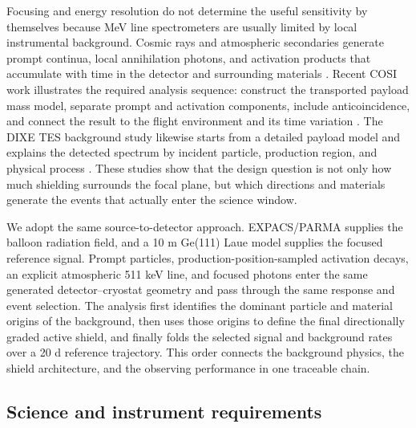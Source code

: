 \documentclass[11pt]{article}
\begin{document}
Focusing and energy resolution do not determine the useful sensitivity by
themselves because MeV line spectrometers are usually limited by local
instrumental background. Cosmic rays and atmospheric secondaries generate
prompt continua, local annihilation photons, and activation products that
accumulate with time in the detector and surrounding materials
\cite{Sturner2003,Gehrels1985}. Recent COSI work illustrates the required
analysis sequence: construct the transported payload mass model, separate
prompt and activation components, include anticoincidence, and connect the
result to the flight environment and its time variation
\cite{Kierans2017,Gallego2025Balloon,Gallego2025,Beechert2022,Sleator2019,Ciabattoni2025ACS}. The DIXE
TES background study likewise starts from a detailed payload model and explains
the detected spectrum by incident particle, production region, and physical
process \cite{Tian2026DIXE}. These studies show that the design question is not
only how much shielding surrounds the focal plane, but which directions and
materials generate the events that actually enter the science window.

We adopt the same source-to-detector approach. EXPACS/PARMA supplies the
balloon radiation field, and a 10 m Ge(111) Laue model supplies the focused
reference signal. Prompt particles, production-position-sampled activation
decays, an explicit atmospheric 511 keV line, and focused photons enter the
same generated detector--cryostat geometry and pass through the same response
and event selection. The analysis first identifies the dominant particle and
material origins of the background, then uses those origins to define the
final directionally graded active shield, and finally folds the selected signal
and background rates over a 20 d reference trajectory. This order connects the
background physics, the shield architecture, and the observing performance in
one traceable chain.

\subsection{Science and instrument requirements}
\label{sec:requirements}
\end{document}
